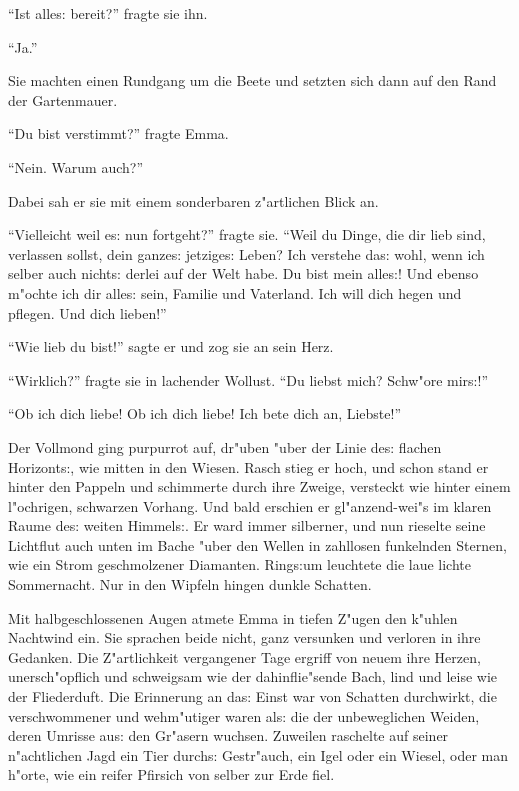 \documentclass[oneside,12pt]{book}
\newcommand{\s}{s:}%
\begin{document}
"`Ist alle{\s} bereit?"' fragte sie ihn.

"`Ja."'

Sie machten einen Rundgang um die Beete und setzten sich dann auf
den Rand der Gartenmauer.

"`Du bist verstimmt?"' fragte Emma.

"`Nein. Warum auch?"'

Dabei sah er sie mit einem sonderbaren z"artlichen Blick an.

"`Vielleicht weil e{\s} nun fortgeht?"' fragte sie. "`Weil du
Dinge, die dir lieb sind, verlassen sollst, dein ganze{\s}
jetzige{\s} Leben? Ich verstehe da{\s} wohl, wenn ich selber auch
nicht{\s} derlei auf der Welt habe. Du bist mein alle{\s}! Und
ebenso m"ochte ich dir alle{\s} sein, Familie und Vaterland. Ich
will dich hegen und pflegen. Und dich lieben!"'

"`Wie lieb du bist!"' sagte er und zog sie an sein Herz.

"`Wirklich?"' fragte sie in lachender Wollust. "`Du liebst mich?
Schw"ore mir{\s}!"'

"`Ob ich dich liebe! Ob ich dich liebe! Ich bete dich an,
Liebste!"'

Der Vollmond ging purpurrot auf, dr"uben "uber der Linie de{\s}
flachen Horizont{\s}, wie mitten in den Wiesen. Rasch stieg er
hoch, und schon stand er hinter den Pappeln und schimmerte durch
ihre Zweige, versteckt wie hinter einem l"ochrigen, schwarzen
Vorhang. Und bald erschien er gl"anzend-wei"s im klaren Raume
de{\s} weiten Himmel{\s}. Er ward immer silberner, und nun
rieselte seine Lichtflut auch unten im Bache "uber den Wellen in
zahllosen funkelnden Sternen, wie ein Strom geschmolzener
Diamanten. Ring{\s}um leuchtete die laue lichte Sommernacht. Nur
in den Wipfeln hingen dunkle Schatten.

Mit halbgeschlossenen Augen atmete Emma in tiefen Z"ugen den
k"uhlen Nachtwind ein. Sie sprachen beide nicht, ganz versunken
und verloren in ihre Gedanken. Die Z"artlichkeit vergangener Tage
ergriff von neuem ihre Herzen, unersch"opflich und schweigsam wie
der dahinflie"sende Bach, lind und leise wie der Fliederduft. Die
Erinnerung an da{\s} Einst war von Schatten durchwirkt, die
verschwommener und wehm"utiger waren al{\s} die der unbeweglichen
Weiden, deren Umrisse au{\s} den Gr"asern wuchsen. Zuweilen
raschelte auf seiner n"achtlichen Jagd ein Tier durch{\s}
Gestr"auch, ein Igel oder ein Wiesel, oder man h"orte, wie ein
reifer Pfirsich von selber zur Erde fiel.
\end{document}
